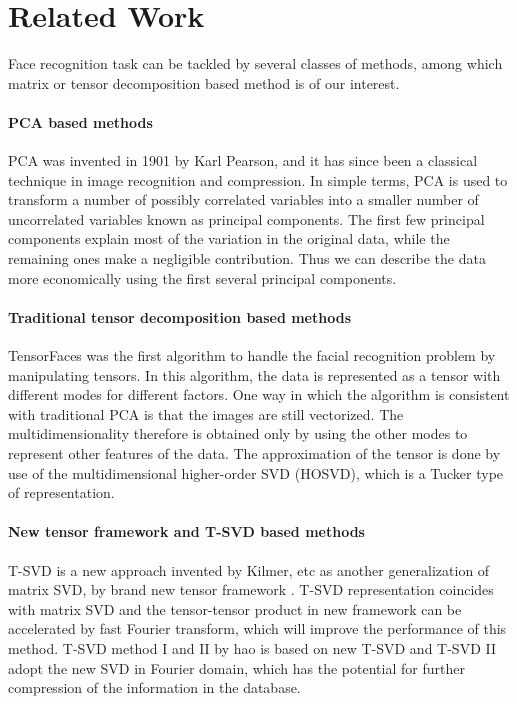 \documentclass[english]{article}
\newcommand{\<}{\langle}
\renewcommand{\>}{\rangle}
\theoremstyle{definition}
\begin{document}
\section{Related Work}
Face recognition task can be tackled by several classes of methods, among which matrix or tensor decomposition based method is of our interest. 
\paragraph{PCA based methods}
PCA was invented in 1901 by Karl Pearson\cite{pearson1901liii}, and
it has since been a classical technique in image recognition and compression. In simple terms,
PCA is used to transform a number of possibly correlated variables into a smaller number of
uncorrelated variables known as principal components. The first few principal components
explain most of the variation in the original data, while the remaining ones make a negligible
contribution. Thus we can describe the data more economically using the first several principal
components. 
\paragraph{Traditional tensor decomposition based methods}
TensorFaces \cite{vasilescu2002multilinear} was the first algorithm to handle the facial recognition
problem by manipulating tensors. In this algorithm, the data is represented as a tensor
with different modes for different factors. One way in which the algorithm is consistent with
traditional PCA is that the images are still vectorized. The multidimensionality therefore is
obtained only by using the other modes to represent other features of the data. The approximation
of the tensor is done by use of the multidimensional higher-order SVD (HOSVD),
which is a Tucker type of representation. 
\paragraph{New tensor framework and T-SVD based methods}
T-SVD is a new approach invented by Kilmer, etc \cite{kilmer2008third}\cite{kilmer2011factorization}\cite{kilmer2013third} as another generalization of matrix SVD, by brand new tensor framework\cite{kilmer2011factorization} . T-SVD representation coincides with matrix SVD and the tensor-tensor product in new framework can be accelerated by fast Fourier transform, which will improve the performance of this method. T-SVD method I and II by hao \cite{hao2013facial} is based on new T-SVD and T-SVD II adopt the new SVD in Fourier domain, which has the potential for further compression of the information in the database. 
\end{document}
